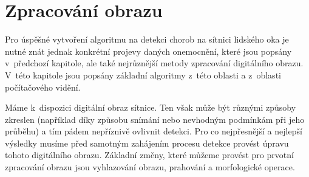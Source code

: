 \chapter{Zpracování obrazu}
\label{ch:techniky}
Pro úspěšné vytvoření algoritmu na detekci chorob na sítnici lidského oka je nutné znát jednak konkrétní projevy daných onemocnění, které jsou popsány v~předchozí kapitole, ale také nejrůznější metody zpracování digitálního obrazu. V~této kapitole jsou popsány základní algoritmy z~této oblasti a z~oblasti počítačového vidění.

Máme k~dispozici digitální obraz sítnice. Ten však může být různými způsoby zkreslen (například díky způsobu snímání nebo nevhodným podmínkám při jeho průběhu) a tím pádem nepříznivě ovlivnit detekci. Pro co nejpřesnější a nejlepší výsledky musíme před samotným zahájením procesu detekce provést úpravu tohoto digitálního obrazu. Základní změny, které můžeme provést pro prvotní zpracování obrazu jsou vyhlazování obrazu, prahování a morfologické operace.

